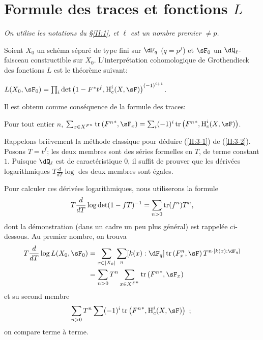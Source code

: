 \section{Formule des traces et fonctions \texorpdfstring{$L$}{L}}\label{II:3}

\emph{On utilise les notations du \S\ref{II:1}, et $\ell$ est un nombre premier 
$\ne p$.}

Soient $X_0$ un schéma séparé de type fini sur $\dF_q$ ($q=p^f$) et 
$\sF_0$ un $\dQ_\ell$-faisceau constructible sur $X_0$. L'interprétation 
cohomologique de Grothendieck des fonctions $L$ est le théorème suivant: 





\begin{theorem_}\label{II:3-1}
$L(X_0,\sF_0) = \prod_i \det\left(1-F^* t^f, \h_c^i(X,\sF)\right)^{(-1)^{i+1}}$. 
\end{theorem_}

Il est obtenu comme conséquence de la formule des traces:





\begin{theorem_}\label{II:3-2}
Pour tout entier $n$, 
$\sum_{x\in X^{F^n}} \tr\left({F^n}^*,\sF_x\right) = \sum_i (-1)^i \tr\left({F^n}^*,\h_c^i(X,\sF)\right)$. 
\end{theorem_}





Rappelons brièvement la méthode classique pour déduire (\ref{II:3-1}) 
de (\ref{II:3-2}). Posons $T=t^f$; les deux membres sont des séries formelles 
en $T$, de terme constant $1$. Puisque $\dQ_\ell$ est de caractéristique 
$0$, il suffit de prouver que les dérivées logarithmiques 
$T\frac{d}{dT}\log$ des deux membres sont égales. 

Pour calculer ces dérivées logarithmiques, nous utiliserons la formule 
\[
  T \frac{d}{dT}\log\det(1-f T)^{-1} = \sum_{n>0} \operatorname{tr}(f^n) T^n \text{,}
\]
dont la démonstration (dans un cadre un peu plus général) est rappelée 
ci-dessous. Au premier nombre, on trouva 
\begin{align*}
  T\frac{d}{dT}\log L(X_0,\sF_0) 
    &= \sum_{x\in |X_0|} \sum_n [k(x):\dF_q] \tr\left(F_x^n,\sF\right) T^{n\cdot[k(x):\dF_q]} \\
    &= \sum_{n>0} T^n \sum_{x\in X^{F^n}} \tr\left({F^n}^*,\sF_x\right)
\end{align*}
et su second membre 
\[
  \sum_{n>0} T^n \sum (-1)^i \tr\left({F^n}^*,\h_c^i(X,\sF)\right) \text{ ; }
\]
on compare terme à terme. 





